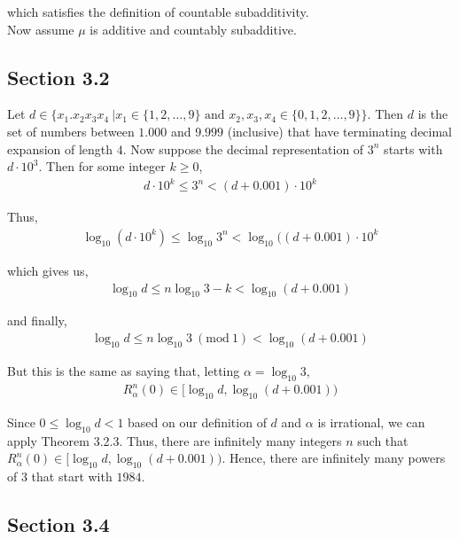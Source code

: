 \documentclass[12pt]{article}
\newenvironment{problem}[2][Problem]{\begin{trivlist}
\item[\hskip \labelsep {\bfseries #1}\hskip \labelsep {\bfseries #2.}]}{\end{trivlist}}
\newcommand{\Mod}[1]{\ (\mathrm{mod}\ #1)}
\begin{document}
which satisfies the definition of countable subadditivity.\\

Now assume $\mu$ is additive and countably subadditive.

\subsection{Section 3.2}

\begin{problem}{2}
\end{problem}

Let $d \in \{x_1.x_2x_3x_4 \ | x_1 \in \{1, 2, \ldots, 9\} \text{ and } x_2, x_3, x_4 \in \{0, 1, 2, \ldots, 9\}\}$. Then $d$ is the set of numbers between $1.000$ and $9.999$ (inclusive) that have terminating decimal expansion of length $4$. Now suppose the decimal representation of $3^n$ starts with $d \cdot 10^3$. Then for some integer $k \geq 0$,
\begin{align*}
d \cdot 10^k \leq 3^n < (d+0.001) \cdot 10^k
\end{align*}

Thus,
\begin{align*}
\log_{10} (d \cdot 10^k) \leq \log_{10} 3^n < \log_{10} ((d+0.001) \cdot 10^k
\end{align*}

which gives us,
\begin{align*}
\log_{10} d \leq n\log_{10} 3 - k < \log_{10}(d+0.001)
\end{align*}

and finally,
\begin{align*}
\log_{10} d \leq n\log_{10} 3 \Mod{1} < \log_{10}(d+0.001)
\end{align*}

But this is the same as saying that, letting $\alpha = \log_{10} 3$,
\begin{align*}
R_{\alpha}^n(0) \in [\log_{10} d, \log_{10}(d+0.001))
\end{align*}

Since $0 \leq \log_{10} d < 1$ based on our definition of $d$ and $\alpha$ is irrational, we can apply Theorem 3.2.3. Thus, there are infinitely many integers $n$ such that $R_{\alpha}^n(0) \in [\log_{10} d, \log_{10} (d+0.001))$. Hence, there are infinitely many powers of $3$ that start with $1984$.

\subsection{Section 3.4}
\end{document}
